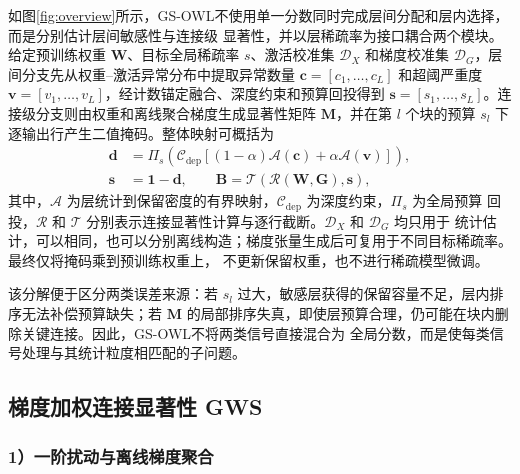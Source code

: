 \documentclass[UTF8,fontset=fandol]{ctexart}
\newcommand{\method}{GS-OWL}
\begin{document}
如图\ref{fig:overview}所示，\method 不使用单一分数同时完成层间分配和层内选择，而是分别估计层间敏感性与连接级
显著性，并以层稀疏率为接口耦合两个模块。给定预训练权重 $\bm W$、目标全局稀疏率 $s$、激活校准集
$\mathcal D_X$ 和梯度校准集 $\mathcal D_G$，层间分支先从权重--激活异常分布中提取异常数量
$\bm c=[c_1,\ldots,c_L]$ 和超阈严重度 $\bm v=[v_1,\ldots,v_L]$，经计数锚定融合、深度约束和预算回投得到
$\bm s=[s_1,\ldots,s_L]$。连接级分支则由权重和离线聚合梯度生成显著性矩阵 $\bm M$，并在第 $l$ 个块的预算
$s_l$ 下逐输出行产生二值掩码。整体映射可概括为
\begin{equation}
\begin{aligned}
\bm d&=\Pi_s\!\left(
\mathcal C_{\mathrm{dep}}\!\left[
(1-\alpha)\mathcal A(\bm c)+\alpha\mathcal A(\bm v)
\right]\right),\\
\bm s&=\bm 1-\bm d,\qquad
\bm B=\mathcal T\!\left(\mathcal R(\bm W,\bm G),\bm s\right),
\end{aligned}
\label{eq:framework}
\end{equation}
其中，$\mathcal A$ 为层统计到保留密度的有界映射，$\mathcal C_{\mathrm{dep}}$ 为深度约束，$\Pi_s$ 为全局预算
回投，$\mathcal R$ 和 $\mathcal T$ 分别表示连接显著性计算与逐行截断。$\mathcal D_X$ 和 $\mathcal D_G$ 均只用于
统计估计，可以相同，也可以分别离线构造；梯度张量生成后可复用于不同目标稀疏率。最终仅将掩码乘到预训练权重上，
不更新保留权重，也不进行稀疏模型微调。

该分解便于区分两类误差来源：若 $s_l$ 过大，敏感层获得的保留容量不足，层内排序无法补偿预算缺失；若
$\bm M$ 的局部排序失真，即使层预算合理，仍可能在块内删除关键连接。因此，\method 不将两类信号直接混合为
全局分数，而是使每类信号处理与其统计粒度相匹配的子问题。

\subsection{梯度加权连接显著性 GWS}

\subsubsection*{1）一阶扰动与离线梯度聚合}
\end{document}
